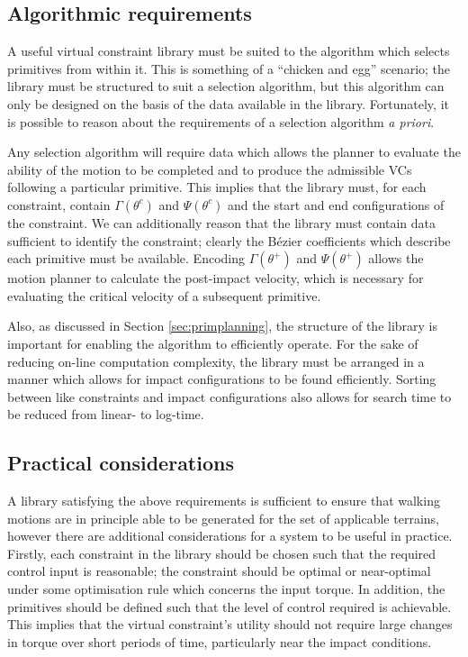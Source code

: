 \subsection{Algorithmic requirements} \label{sec:algreqs}
A useful virtual constraint library must be suited to the algorithm which selects primitives from within it. This is something of a ``chicken and egg'' scenario; the library must be structured to suit a selection algorithm, but this algorithm can only be designed on the basis of the data available in the library. Fortunately, it is possible to reason about the requirements of a selection algorithm \textit{a priori}.

Any selection algorithm will require data which allows the planner to evaluate the ability of the motion to be completed and to produce the admissible VCs following a particular primitive. This implies that the library must, for each constraint, contain $\Gamma(\theta^c)$ and $\Psi(\theta^c)$ and the start and end configurations of the constraint. We can additionally reason that the library must contain data sufficient to identify the constraint; clearly the Bézier coefficients which describe each primitive must be available. Encoding $\Gamma(\theta^+)$ and $\Psi(\theta^+)$ allows the motion planner to calculate the post-impact velocity, which is necessary for evaluating the critical velocity of a subsequent primitive.

Also, as discussed in Section \ref{sec:primplanning}, the structure of the library is important for enabling the algorithm to efficiently operate. For the sake of reducing on-line computation complexity, the library must be arranged in a manner which allows for impact configurations to be found efficiently. Sorting between like constraints and impact configurations also allows for search time to be reduced from linear- to log-time.

\subsection{Practical considerations}
A library satisfying the above requirements is sufficient to ensure that walking motions are in principle able to be generated for the set of applicable terrains, however there are additional considerations for a system to be useful in practice. Firstly, each constraint in the library should be chosen such that the required control input is reasonable; the constraint should be optimal or near-optimal under some optimisation rule which concerns the input torque. In addition, the primitives should be defined such that the level of control required is achievable. This implies that the virtual constraint's utility should not require large changes in torque over short periods of time, particularly near the impact conditions.

